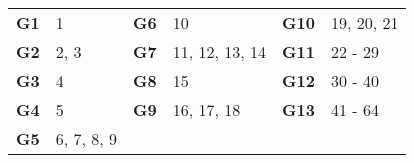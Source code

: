 \vspace{5mm}

\noindent
\begin{tabular}{|r|l||r|l||r|l|}

\hline

\textbf{G1} & 1 & \textbf{G6} & 10 & \textbf{G10} & 19, 20, 21 \\
\textbf{G2} & 2, 3 & \textbf{G7} & 11, 12, 13, 14 & \textbf{G11} & 22 - 29 \\
\textbf{G3} & 4 & \textbf{G8} & 15 & \textbf{G12} & 30 - 40 \\
\textbf{G4} & 5 & \textbf{G9} & 16, 17, 18 & \textbf{G13} & 41 - 64 \\
\textbf{G5} & 6, 7, 8, 9 & & & & \\

\hline

\end{tabular}
